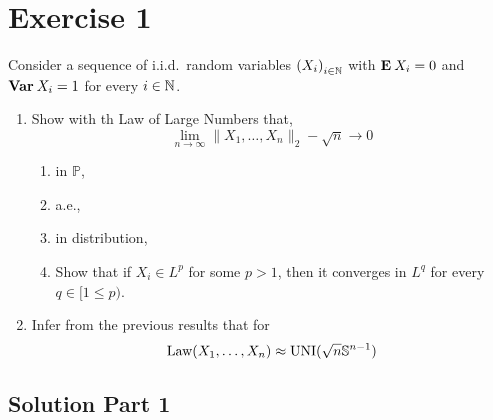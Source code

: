 
\section{Exercise 1}
Consider a sequence of i.i.d.~random variables ${(X_i)}_{i\in\N}$ with $\E X_i = 0$ and $\Var X_i = 1$ for every $i\in \N$.

\begin{enumerate}
    \item Show with th Law of Large Numbers that,
    \[ \lim_{n\to\infty} \|X_1,\ldots,X_n\|_2 - \sqrt{n} \to 0 \]
    \begin{enumerate}[label=(\alph*)]
        \item in $\mathbb{P}$,
        \item a.e.,
        \item in distribution,
        \item Show that if $X_i \in L^p$ for some $p>1$, then it converges in $L^q$ for every $q \in [1\leq p)$.
    \end{enumerate} 
    \item Infer from the previous results that for
    \[ \text{Law}(X_1 , \ldots, X_n) \approx \text{UNI}(\sqrt{n} \S^{n-1}) \]
\end{enumerate}

\subsection*{Solution Part 1}
